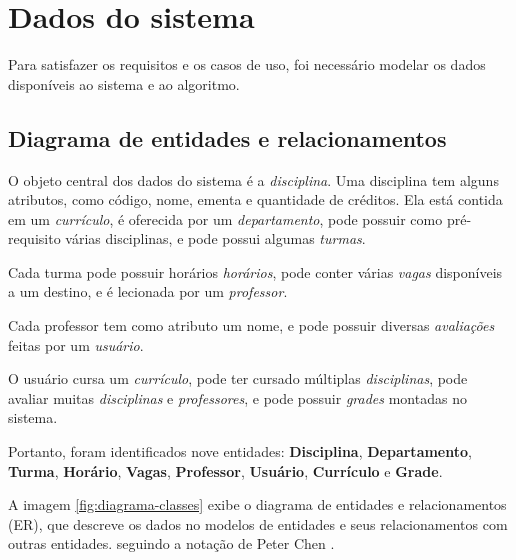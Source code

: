 \chapter{Dados do sistema}
\label{cha:Dados do sistema}

Para satisfazer os requisitos e os casos de uso, foi necessário modelar os dados disponíveis ao sistema e ao algoritmo.

\section{Diagrama de entidades e relacionamentos}

O objeto central dos dados do sistema é a \textit{disciplina}. Uma disciplina tem alguns atributos, como código, nome, ementa e quantidade de créditos. Ela está contida em um \textit{currículo}, é oferecida por um \textit{departamento}, pode possuir como pré-requisito várias disciplinas, e pode possui algumas \textit{turmas}.

Cada turma pode possuir horários \textit{horários}, pode conter várias \textit{vagas} disponíveis a um destino, e é lecionada por um \textit{professor}.

Cada professor tem como atributo um nome, e pode possuir diversas \textit{avaliações} feitas por um \textit{usuário}.

O usuário cursa um \textit{currículo}, pode ter cursado múltiplas \textit{disciplinas}, pode avaliar muitas \textit{disciplinas} e \textit{professores}, e pode possuir \textit{grades} montadas no sistema.

Portanto, foram identificados nove entidades: \textbf{Disciplina}, \textbf{Departamento}, \textbf{Turma}, \textbf{Horário}, \textbf{Vagas}, \textbf{Professor}, \textbf{Usuário}, \textbf{Currículo} e \textbf{Grade}.

A imagem \ref{fig:diagrama-classes} exibe o diagrama de entidades e relacionamentos (ER), que descreve os dados no modelos de entidades e seus relacionamentos com outras entidades. seguindo a notação de Peter Chen \cite{peter-chen}. 

